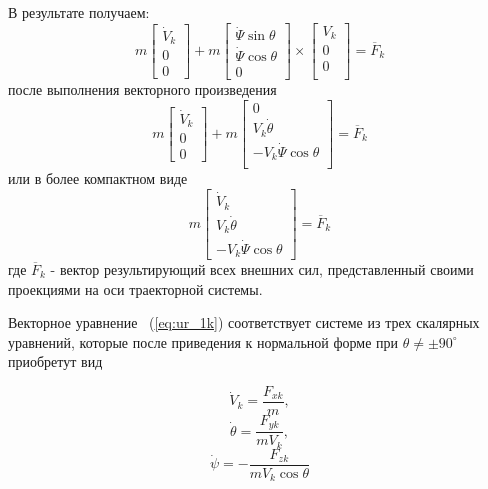 В результате получаем:
\begin{equation}
m 
\begin{bmatrix}
\Dot{V}_k \\
0\\
0
\end{bmatrix} + m
\begin{bmatrix}
\Dot{\Psi} \sin{\theta} \\
\Dot{\Psi} \cos{\theta}\\
0
\end{bmatrix} \times 
\begin{bmatrix} V_k\\
0\\
0\\
\end{bmatrix} = \overline{F}_k
\end{equation}
после выполнения векторного произведения
\begin{equation}
m 
\begin{bmatrix}
\Dot{V}_k \\
0\\
0
\end{bmatrix} + m
\begin{bmatrix} 0\\
V_k \Dot{\theta}\\
- V_k \Dot{\Psi} \cos{\theta}\\
\end{bmatrix} = \overline{F}_k
\end{equation}
или в более компактном виде 
\begin{equation}
m 
\begin{bmatrix}
\Dot{V}_k \\
V_k \Dot{\theta}\\
- V_k \Dot{\Psi} \cos{\theta}
\end{bmatrix} = \overline{F}_k
\label{eq:ur_1k}
\end{equation}
где $\overline{F}_k$ - вектор результирующий всех внешних сил, представленный своими проекциями на оси траекторной системы.

Векторное уравнение ~(\ref{eq:ur_1k}) соответствует системе из трех скалярных уравнений, которые после приведения к нормальной форме при $\theta \neq \pm 90^{\circ}$ приобретут вид

\begin{equation}
\dot{V}_k = \frac{F_{xk}}{m},
\end{equation}
\begin{equation}
\dot{\theta} = \frac{F_{yk}}{mV_k},
\end{equation}
\begin{equation}
\dot{\psi} =- \frac{F_{zk}}{mV_k\cos{\theta}}
\end{equation}
\clearpage
